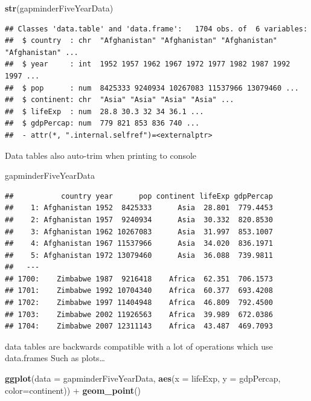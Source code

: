 \documentclass[]{article}
\newenvironment{Shaded}{\begin{snugshade}}{\end{snugshade}}
\newcommand{\KeywordTok}[1]{\textcolor[rgb]{0.13,0.29,0.53}{\textbf{{#1}}}}
\newcommand{\DataTypeTok}[1]{\textcolor[rgb]{0.13,0.29,0.53}{{#1}}}
\newcommand{\StringTok}[1]{\textcolor[rgb]{0.31,0.60,0.02}{{#1}}}
\newcommand{\NormalTok}[1]{{#1}}
\begin{document}
\begin{Shaded}
\begin{Highlighting}[]
\KeywordTok{str}\NormalTok{(gapminderFiveYearData)}
\end{Highlighting}
\end{Shaded}

\begin{verbatim}
## Classes 'data.table' and 'data.frame':   1704 obs. of  6 variables:
##  $ country  : chr  "Afghanistan" "Afghanistan" "Afghanistan" "Afghanistan" ...
##  $ year     : int  1952 1957 1962 1967 1972 1977 1982 1987 1992 1997 ...
##  $ pop      : num  8425333 9240934 10267083 11537966 13079460 ...
##  $ continent: chr  "Asia" "Asia" "Asia" "Asia" ...
##  $ lifeExp  : num  28.8 30.3 32 34 36.1 ...
##  $ gdpPercap: num  779 821 853 836 740 ...
##  - attr(*, ".internal.selfref")=<externalptr>
\end{verbatim}

Data tables also auto-trim when printing to console

\begin{Shaded}
\begin{Highlighting}[]
\NormalTok{gapminderFiveYearData}
\end{Highlighting}
\end{Shaded}

\begin{verbatim}
##           country year      pop continent lifeExp gdpPercap
##    1: Afghanistan 1952  8425333      Asia  28.801  779.4453
##    2: Afghanistan 1957  9240934      Asia  30.332  820.8530
##    3: Afghanistan 1962 10267083      Asia  31.997  853.1007
##    4: Afghanistan 1967 11537966      Asia  34.020  836.1971
##    5: Afghanistan 1972 13079460      Asia  36.088  739.9811
##   ---                                                      
## 1700:    Zimbabwe 1987  9216418    Africa  62.351  706.1573
## 1701:    Zimbabwe 1992 10704340    Africa  60.377  693.4208
## 1702:    Zimbabwe 1997 11404948    Africa  46.809  792.4500
## 1703:    Zimbabwe 2002 11926563    Africa  39.989  672.0386
## 1704:    Zimbabwe 2007 12311143    Africa  43.487  469.7093
\end{verbatim}

data tables are backwards compatible with a lot of operations which use
data.frames Such as plots\ldots{}

\begin{Shaded}
\begin{Highlighting}[]
\KeywordTok{ggplot}\NormalTok{(}\DataTypeTok{data =} \NormalTok{gapminderFiveYearData, }\KeywordTok{aes}\NormalTok{(}\DataTypeTok{x =} \NormalTok{lifeExp, }\DataTypeTok{y =} \NormalTok{gdpPercap, }\DataTypeTok{color=}\NormalTok{continent)) +}
\StringTok{  }\KeywordTok{geom_point}\NormalTok{()}
\end{Highlighting}
\end{Shaded}
\end{document}
